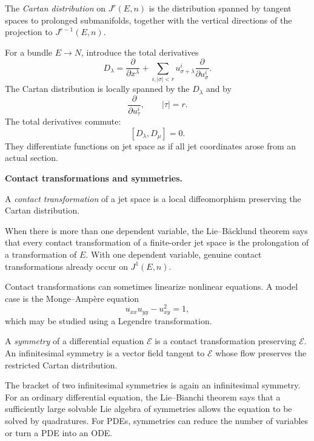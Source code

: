 \begin{definition}
\label{definition-cartan-distribution}
The \textit{Cartan distribution} on
$J^r(E,n)$ is the distribution spanned by
tangent spaces to prolonged submanifolds,
together with the vertical directions of
the projection to $J^{r-1}(E,n)$.
\end{definition}

For a bundle $E\to N$, introduce the total
derivatives
$$
D_\lambda=
\frac{\partial}{\partial x^\lambda}
+
\sum_{i,|\sigma|<r}
u^i_{\sigma+\lambda}
\frac{\partial}{\partial u^i_\sigma}.
$$
The Cartan distribution is locally spanned
by the $D_\lambda$ and by
$$
\frac{\partial}{\partial u^i_\tau},
\qquad |\tau|=r.
$$
The total derivatives commute:
$$
[D_\lambda,D_\mu]=0.
$$
They differentiate functions on jet space
as if all jet coordinates arose from an
actual section.

\medskip\noindent
{\bf Contact transformations and
symmetries.}

\begin{definition}
\label{definition-contact-transformation}
A \textit{contact transformation} of a jet
space is a local diffeomorphism preserving
the Cartan distribution.
\end{definition}

When there is more than one dependent
variable, the Lie--B\"acklund theorem says
that every contact transformation of a
finite-order jet space is the prolongation
of a transformation of $E$. With one
dependent variable, genuine contact
transformations already occur on
$J^1(E,n)$.

Contact transformations can sometimes
linearize nonlinear equations. A model
case is the Monge--Amp\`ere equation
$$
u_{xx}u_{yy}-u_{xy}^2=1,
$$
which may be studied using a Legendre
transformation.

\begin{definition}
\label{definition-symmetry-pde}
A \textit{symmetry} of a differential
equation $\mathcal{E}$ is a contact
transformation preserving $\mathcal{E}$.
An infinitesimal symmetry is a vector field
tangent to $\mathcal{E}$ whose flow
preserves the restricted Cartan
distribution.
\end{definition}

The bracket of two infinitesimal symmetries
is again an infinitesimal symmetry. For an
ordinary differential equation, the
Lie--Bianchi theorem says that a sufficiently
large solvable Lie algebra of symmetries
allows the equation to be solved by
quadratures. For PDEs, symmetries can reduce
the number of variables or turn a PDE into
an ODE.

